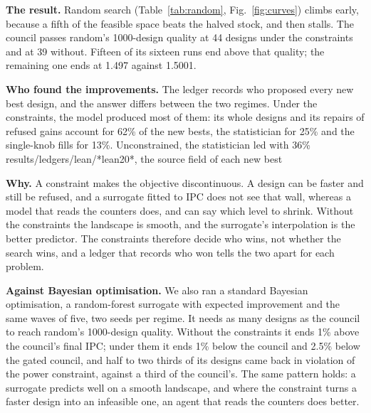 \documentclass[conference]{IEEEtran}
\begin{document}
\textbf{The result.} Random search (Table~\ref{tab:random}, Fig.~\ref{fig:curves}) climbs early,
because a fifth of the feasible space beats the halved stock, and then stalls. The council passes
random's 1000-design quality at 44 designs under the constraints and at 39 without. Fifteen of
its sixteen runs end above that quality; the remaining one ends at 1.497 against 1.5001. %

\textbf{Who found the improvements.} The ledger records who proposed every new best design, and
the answer differs between the two regimes. Under the constraints, the model produced most of
them: its whole designs and its repairs of refused gains account for 62\% of the new bests, the
statistician for 25\% and the single-knob fills for 13\%. Unconstrained, the statistician led
with 36\% results/ledgers/lean/*lean20*, the source field of each new best

\textbf{Why.} A constraint makes the objective discontinuous. A design can be faster and still be
refused, and a surrogate fitted to IPC does not see that wall, whereas a model that reads the
counters does, and can say which level to shrink. Without the constraints the landscape is
smooth, and the surrogate's interpolation is the better predictor. The constraints therefore
decide who wins, not whether the search wins, and a ledger that records who won tells the two
apart for each problem.

\textbf{Against Bayesian optimisation.} We also ran a standard Bayesian optimisation, a
random-forest surrogate with expected improvement and the same waves of five, two seeds per
regime. It needs as many designs as the council to reach random's 1000-design quality. Without
the constraints it ends 1\% above the council's final IPC; under them it ends 1\% below the
council and 2.5\% below the gated council, and half to two thirds of its designs came back in
violation of the power constraint, against a third of the council's.
The same pattern holds: a surrogate predicts well on a smooth landscape, and where the constraint
turns a faster design into an infeasible one, an agent that reads the counters does better.

\end{document}
